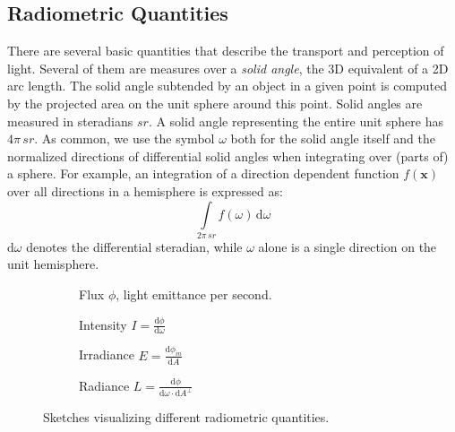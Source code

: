 \documentclass[thesis.tex]{subfiles}
\begin{document}
\subsection{Radiometric Quantities}
There are several basic quantities that describe the transport and perception of light.
Several of them are measures over a \emph{solid angle}, the 3D equivalent of a 2D arc length.
The solid angle subtended by an object in a given point is computed by the projected area on the unit sphere around this point.
Solid angles are measured in steradians $sr$.
A solid angle representing the entire unit sphere has $4\pi\,sr$.
As common, we use the symbol $\omega$ both for the solid angle itself and the normalized directions of differential solid angles when integrating over (parts of) a sphere.
For example, an integration of a direction dependent function $f(\mathbf{x})$ over all directions in a hemisphere is expressed as:
\begin{equation}
\int\limits_{2\pi\,sr} f(\omega) \, \mathrm{d}\omega
\end{equation} 
$\mathrm{d}\omega$ denotes the differential steradian, while $\omega$ alone is a single direction on the unit hemisphere.

\begin{figure}[h]
\centering
\begin{subfigure}[b]{0.45\textwidth}
\centering
{}
\caption{Flux $\phi$, light emittance per second.}
\label{fig:flux}
\end{subfigure}
\begin{subfigure}[b]{0.45\textwidth}
\centering
{}
\caption{Intensity $I = \frac{\mathrm{d}\phi}{\mathrm{d}\omega}$}
\label{fig:intensity}
\end{subfigure}

\vspace{10pt}

\begin{subfigure}[b]{0.45\textwidth}
\centering
{}
\caption{Irradiance $E = \frac{\mathrm{d}\phi_{in}}{\mathrm{d}A}$}
\label{fig:irradiance}
\end{subfigure}
\begin{subfigure}[b]{0.45\textwidth}
\centering
{}
\caption{Radiance $L = \frac{\mathrm{d}\phi}{\mathrm{d}\omega \cdot \mathrm{d}A^\perp }$}
\label{fig:radiance}
\end{subfigure}
\caption{Sketches visualizing different radiometric quantities.}
\end{figure}
\end{document}
